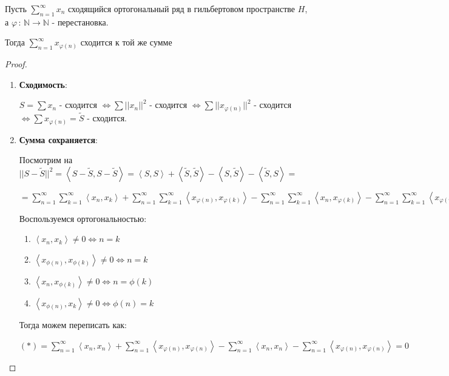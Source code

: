 \begin{consequence}
    Пусть $\sum_{n = 1}^{\infty} x_n$ сходящийся ортогональный ряд в гильбертовом пространстве $H$, а $\varphi \, : \, \mathbb{N} \to \mathbb{N}$ - перестановка.

    Тогда $\sum_{n = 1}^\infty x_{\varphi(n)} $ сходится к той же сумме
\end{consequence}

\begin{proof}
    \begin{enumerate}
        \item {
        \textbf{Сходимость}:

        $S = \sum x_n$ - сходится $\Longleftrightarrow \sum ||x_n||^2$ - сходится $\Longleftrightarrow \sum ||x_{\varphi(n)}||^2$ - сходится $\Longleftrightarrow \sum x_{\varphi(n)} = \tilde{S}$ - сходится.
        }
        \item {
        \textbf{Сумма сохраняется}:


        Посмотрим на $||S - \tilde{S}||^2 = \left <  S - \tilde{S}, S - \tilde{S} \right > = \left < S, S \right > + \left < \tilde{S}, \tilde{S} \right > - \left < S, \tilde{S} \right > - \left < \tilde{S}, S \right > = $

        $= \sum_{n = 1}^\infty \sum_{k = 1}^\infty \left < x_n, x_k \right > + \sum_{n = 1}^\infty \sum_{k = 1}^\infty \left < x_{\varphi(n)}, x_{\varphi(k)} \right > - \sum_{n = 1}^\infty \sum_{k = 1}^\infty \left < x_n, x_{\varphi(k)} \right > - \sum_{n = 1}^\infty \sum_{k = 1}^\infty \left < x_{\varphi(n)}, x_k \right > = (*)$

        Воспользуемся ортогональностью:

        \begin{enumerate}
            \item {
                $\left< x_n, x_k \right> \neq 0 \Leftrightarrow n = k$
            }
            \item {
                $\left< x_{\phi(n)}, x_{\phi(k)} \right> \neq 0 \Leftrightarrow n = k$
            }
            \item {
                $\left< x_n, x_{\phi(k)} \right> \neq 0 \Leftrightarrow n = \phi(k)$
            }
            \item {
                $\left< x_{\phi(n)}, x_k \right> \neq 0 \Leftrightarrow \phi(n) = k$
            }
        \end{enumerate}

        Тогда можем переписать как:

        $(*) = \sum_{n = 1}^\infty \left < x_n , x_n \right > + \sum_{n = 1}^\infty \left < x_{\varphi(n)}, x_{\varphi(n)} \right > - \sum_{n = 1}^\infty \left < x_n, x_n \right > - \sum_{n = 1}^\infty \left < x_{\varphi(n)}, x_{\varphi(n)} \right > = 0 $
        }
    \end{enumerate}
\end{proof}


